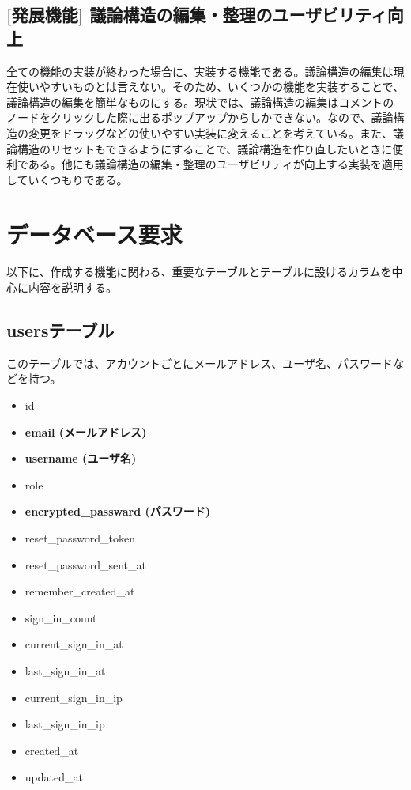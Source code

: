 \documentclass[12pt, oneside]{jreport}
\begin{document}
		\subsection{[発展機能] 議論構造の編集・整理のユーザビリティ向上}
		全ての機能の実装が終わった場合に、実装する機能である。議論構造の編集は現在使いやすいものとは言えない。そのため、いくつかの機能を実装することで、議論構造の編集を簡単なものにする。現状では、議論構造の編集はコメントのノードをクリックした際に出るポップアップからしかできない。なので、議論構造の変更をドラッグなどの使いやすい実装に変えることを考えている。また、議論構造のリセットもできるようにすることで、議論構造を作り直したいときに便利である。他にも議論構造の編集・整理のユーザビリティが向上する実装を適用していくつもりである。

	\section{データベース要求}
	
	以下に、作成する機能に関わる、重要なテーブルとテーブルに設けるカラムを中心に内容を説明する。
	
		\subsection{usersテーブル}
		このテーブルでは、アカウントごとにメールアドレス、ユーザ名、パスワードなどを持つ。
		\begin{itemize}
		\item id
		\item {\bf email (メールアドレス)}
		\item {\bf username (ユーザ名)}
		\item role
		\item {\bf encrypted\_passward (パスワード)}
		\item reset\_password\_token
		\item reset\_password\_sent\_at 
		\item remember\_created\_at
		\item sign\_in\_count
		\item current\_sign\_in\_at
		\item last\_sign\_in\_at
		\item current\_sign\_in\_ip
		\item last\_sign\_in\_ip
		\item created\_at
		\item updated\_at 
		\end{itemize}
				
\end{document}
